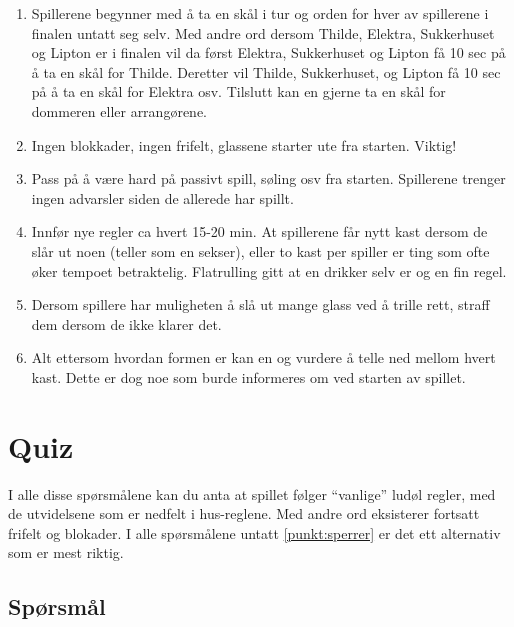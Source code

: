 \documentclass[10pt,a4paper,norsk,openany]{book}
\begin{document}
\begin{enumerate}
  \item Spillerene begynner med å ta en skål i tur og orden for hver av
    spillerene i finalen
    untatt seg selv. Med andre ord dersom Thilde, Elektra, Sukkerhuset og Lipton
    er i finalen vil da først Elektra, Sukkerhuset og Lipton få 10 sec på å ta
    en skål for Thilde. Deretter vil Thilde, Sukkerhuset, og Lipton få 10 sec på
    å ta en skål for Elektra osv. Tilslutt kan en gjerne ta en skål for
    dommeren eller arrangørene.
  \item Ingen blokkader, ingen frifelt, glassene starter ute fra starten.
    Viktig!
  \item Pass på å være hard på passivt spill, søling osv fra starten. Spillerene
    trenger ingen advarsler siden de allerede har spillt.
  \item Innfør nye regler ca hvert 15-20 min. At spillerene får nytt kast dersom
    de slår ut noen (teller som en sekser), eller to kast per spiller er ting
    som ofte øker tempoet betraktelig. Flatrulling gitt at en drikker selv er og
    en fin regel.
  \item Dersom spillere har muligheten å slå ut mange glass ved å trille rett,
    straff dem dersom de ikke klarer det.
  \item Alt ettersom hvordan formen er kan en og vurdere å telle ned mellom
    hvert kast. Dette er dog noe som burde informeres om ved starten av spillet.
\end{enumerate}

\chapter{Quiz}
\label{chap:quiz}
I alle disse spørsmålene kan du anta at spillet følger ``vanlige'' ludøl
regler, med de utvidelsene som er nedfelt i hus-reglene. Med andre ord
eksisterer fortsatt frifelt og blokader. I alle spørsmålene untatt
\cref{punkt:sperrer} er det ett alternativ som er mest riktig.  

\section{Spørsmål}
\end{document}
